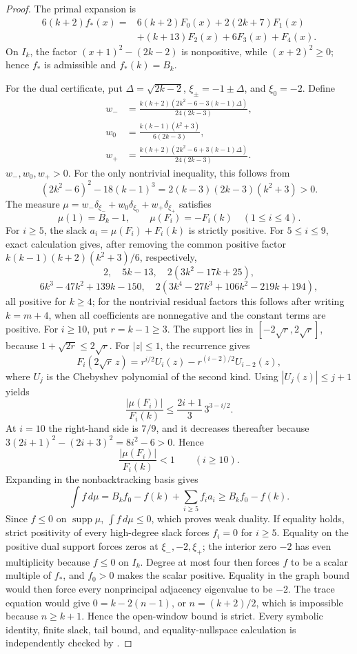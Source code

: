\documentclass[a4paper,10pt,reqno]{amsart}
\theoremstyle{plain}
\theoremstyle{definition}
\theoremstyle{remark}
\newcommand{\RepoTag}{v2.2.8}
\newcommand{\codefile}[1]{%
  \href{https://github.com/SamPetkov/wow284/blob/\RepoTag/#1}{\path{#1}}}
\begin{document}
\begin{proof}
The primal expansion is
\[
\begin{aligned}
6(k+2)f_*(x)={}&6(k+2)F_0(x)+2(2k+7)F_1(x)\\
&+(k+13)F_2(x)+6F_3(x)+F_4(x).
\end{aligned}
\]
On \(I_k\), the factor \((x+1)^2-(2k-2)\) is nonpositive, while
\((x+2)^2\ge0\); hence \(f_*\) is admissible and \(f_*(k)=B_k\).

For the dual certificate, put \(\Delta=\sqrt{2k-2}\),
\(\xi_\pm=-1\pm\Delta\), and \(\xi_0=-2\).  Define
\begin{align*}
w_-&=\frac{k(k+2)(2k^2-6-3(k-1)\Delta)}{24(2k-3)},\\
w_0&=\frac{k(k-1)(k^2+3)}{6(2k-3)},\\
w_+&=\frac{k(k+2)(2k^2-6+3(k-1)\Delta)}{24(2k-3)}.
\end{align*}
\(w_-,w_0,w_+>0\).  For the only nontrivial inequality, this follows from
\[
 (2k^2-6)^2-18(k-1)^3
 =2(k-3)(2k-3)(k^2+3)>0.
\]
The measure
\(\mu=w_-\delta_{\xi_-}+w_0\delta_{\xi_0}+w_+\delta_{\xi_+}\) satisfies
\[
 \mu(1)=B_k-1,
 \qquad \mu(F_i)=-F_i(k)\quad(1\le i\le4).
\]
For \(i\ge5\), the slack \(a_i=\mu(F_i)+F_i(k)\) is strictly positive.  For
\(5\le i\le9\), exact calculation gives, after removing the common positive
factor \(k(k-1)(k+2)(k^2+3)/6\), respectively,
\[
 2,\quad 5k-13,\quad 2(3k^2-17k+25),
\]
\[
 6k^3-47k^2+139k-150,
 \quad
 2(3k^4-27k^3+106k^2-219k+194),
\]
all positive for \(k\ge4\); for the nontrivial residual factors this follows
after writing \(k=m+4\), when all coefficients are nonnegative and the
constant terms are positive.  For \(i\ge10\), put \(r=k-1\ge3\).
The support lies in \([-2\sqrt r,2\sqrt r]\), because
\(1+\sqrt{2r}\le2\sqrt r\).  For \(|z|\le1\), the recurrence gives
\[
 F_i(2\sqrt r\,z)
 =r^{i/2}U_i(z)-r^{(i-2)/2}U_{i-2}(z),
\]
where \(U_j\) is the Chebyshev polynomial of the second kind.  Using
\(|U_j(z)|\le j+1\) yields
\[
 \frac{|\mu(F_i)|}{F_i(k)}
 \le \frac{2i+1}{3}\,3^{3-i/2}.
\]
At \(i=10\) the right-hand side is \(7/9\), and it decreases thereafter
because \(3(2i+1)^2-(2i+3)^2=8i^2-6>0\).  Hence
\[
 \frac{|\mu(F_i)|}{F_i(k)}<1\qquad(i\ge10).
\]
Expanding in the nonbacktracking basis gives
\[
 \int f\,d\mu
 =B_kf_0-f(k)+\sum_{i\ge5}f_i a_i
 \ge B_kf_0-f(k).
\]
Since \(f\le0\) on \(\operatorname{supp}\mu\),
\(\int f\,d\mu\le0\), which proves weak duality.
If equality holds, strict positivity of every high-degree slack forces
\(f_i=0\) for \(i\ge5\).  Equality on the positive dual support forces zeros
at \(\xi_-,-2,\xi_+\); the interior zero \(-2\) has even multiplicity because
\(f\le0\) on \(I_k\).  Degree at most four then forces \(f\) to be a scalar
multiple of \(f_*\), and \(f_0>0\) makes the scalar positive.  Equality in the
graph bound would then force every nonprincipal adjacency eigenvalue to be
\(-2\).  The trace equation would give \(0=k-2(n-1)\), or
\(n=(k+2)/2\), which is impossible because \(n\ge k+1\).  Hence the
open-window bound is strict.  Every symbolic identity, finite slack, tail bound, and
equality-nullspace calculation is independently checked by
\codefile{scripts/verify_proof_audit_02_two_sided_lp.py}.
\end{proof}
\end{document}
